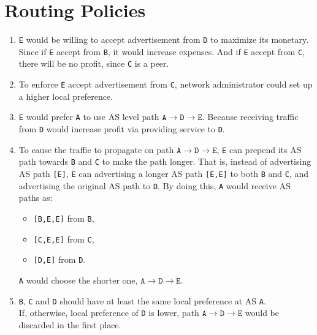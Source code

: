 \documentclass[12pt,titlepage,letterpaper]{article}
\begin{document}
\section{Routing Policies}
\begin{enumerate}[label=\bfseries\alph*)]
    \item \texttt{E} would be willing to accept advertisement from \texttt{D}
        to maximize its monetary. Since if \texttt{E} accept from \texttt{B},
        it would increase expenses. And if \texttt{E} accept from \texttt{C},
        there will be no profit, since \texttt{C} is a peer.
    \item To enforce \texttt{E} accept advertisement from \texttt{C}, network
        administrator could set up a higher local preference.
    \item \texttt{E} would prefer \texttt{A} to use AS level path
        $\mathtt{A}\rightarrow\mathtt{D}\rightarrow\mathtt{E}$. Because
        receiving traffic from \texttt{D} would increase profit via providing
        service to \texttt{D}.
    \item To cause the traffic to propagate on path 
        $\mathtt{A}\rightarrow\mathtt{D}\rightarrow\mathtt{E}$, \texttt{E} can
        prepend its AS path towards \texttt{B} and \texttt{C} to make the path
        longer. That is, instead of advertising AS path \texttt{[E]},
        \texttt{E} can advertising a longer AS path \texttt{[E,E]} to both
        \texttt{B} and \texttt{C}, and advertising the original AS path to
        \texttt{D}. By doing this, \texttt{A} would receive AS paths as:
        \begin{itemize}
            \item \texttt{[B,E,E]} from \texttt{B},
            \item \texttt{[C,E,E]} from \texttt{C},
            \item \texttt{[D,E]} from \texttt{D}.
        \end{itemize}
        \texttt{A} would choose the shorter one,
        $\mathtt{A}\rightarrow\mathtt{D}\rightarrow\mathtt{E}$.
    \item \texttt{B}, \texttt{C} and \texttt{D} should have at least the same
        local preference at AS \texttt{A}.\\ If, otherwise, local preference of
        \texttt{D} is lower, path
        $\mathtt{A}\rightarrow\mathtt{D}\rightarrow\mathtt{E}$
        would be discarded in the first place.
\end{enumerate}
\end{document}
